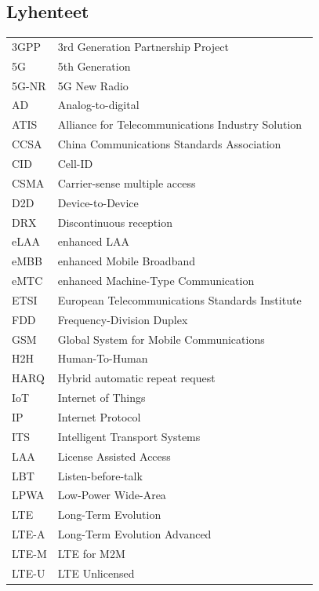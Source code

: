 \documentclass[finnish, 12pt, a4paper, elec, latin1, utf8, online]{aaltothesis}
\begin{document}
\subsection*{Lyhenteet}
\begin{tabular}{ll}
3GPP & 3rd Generation Partnership Project \\
5G & 5th Generation \\
5G-NR & 5G New Radio \\
AD & Analog-to-digital \\
ATIS & Alliance for Telecommunications Industry Solution \\
CCSA & China Communications Standards Association \\
CID & Cell-ID \\
CSMA & Carrier-sense multiple access \\
D2D & Device-to-Device \\
DRX & Discontinuous reception  \\
eLAA & enhanced LAA \\
eMBB & enhanced Mobile Broadband \\
eMTC & enhanced Machine-Type Communication \\
ETSI & European Telecommunications Standards Institute \\
FDD & Frequency-Division Duplex \\
GSM & Global System for Mobile Communications \\
H2H & Human-To-Human \\
HARQ & Hybrid automatic repeat request \\
IoT & Internet of Things \\
IP & Internet Protocol \\
ITS & Intelligent Transport Systems \\
LAA & License Assisted Access \\
LBT & Listen-before-talk \\
LPWA & Low-Power Wide-Area \\
LTE & Long-Term Evolution \\
LTE-A & Long-Term Evolution Advanced \\
LTE-M & LTE for M2M \\
LTE-U & LTE Unlicensed \\

\end{tabular}
\end{document}
